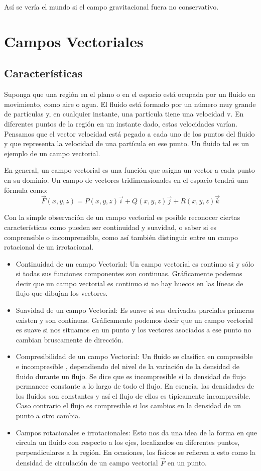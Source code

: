 \documentclass[10pt]{article}
\begin{document}
	Así se vería el mundo si el campo gravitacional fuera no conservativo.


\section{Campos Vectoriales}
\subsection{Características}%
	\parindent=0.2in
	\hangindent=0.2in
	Suponga que una región en el plano o en el espacio está ocupada por un fluido en movimiento, como aire o agua. El fluido está formado por un número muy grande de partículas y, en cualquier instante, una partícula tiene una velocidad v. En diferentes puntos de la región en un instante dado, estas velocidades varían. Pensamos que el vector velocidad está pegado a cada uno de los puntos del fluido y que representa la velocidad de una partícula en ese punto. Un fluido tal es un ejemplo de un campo vectorial. 
	\pagebreak

	\parindent=0.2in
	\hangindent=0.2in
	En general, un campo vectorial es una función que asigna un vector a cada punto en su dominio. Un campo de vectores tridimensionales en el espacio tendrá una fórmula como:
	\[ \vec{F}(x,y,z) = P(x,y,z)\vec{i} + Q(x,y,z)\vec{j} + R(x,y,z)\vec{k}  \]

	\parindent=0.2in
	\hangindent=0.2in
	Con la simple observación de un campo vectorial es posible reconocer ciertas características como pueden ser continuidad y suavidad, o saber si es comprensible o incomprensible, como así también distinguir entre un campo rotacional de un irrotacional. 
	\begin{itemize}
		\item Continuidad de un campo Vectorial: Un campo vectorial es continuo si y sólo si todas sus funciones componentes son continuas. Gráficamente podemos decir que un campo vectorial es continuo si no hay huecos en las líneas de flujo que dibujan los vectores.
		\item Suavidad de un campo Vectorial: Es suave si sus derivadas parciales primeras existen y son continuas. Gráficamente podemos decir que un campo vectorial es suave si nos situamos en un punto y los vectores asociados a ese punto no cambian bruscamente de dirección.
		\item Compresibilidad de un campo Vectorial: Un fluido se clasifica en compresible e incompresible , dependiendo del nivel de la variación de la densidad de fluido durante un flujo. Se dice que es incompresible si la densidad de flujo permanece constante a lo largo de todo el flujo. En esencia, las densidades de los fluidos son constantes y así el flujo de ellos es típicamente incompresible. Caso contrario el flujo es compresible si los cambios en la densidad de un punto a otro cambia.
		\item Campos rotacionales e irrotacionales:  Esto nos da una idea de la forma en que circula un fluido con respecto a los ejes, localizados en diferentes puntos, perpendiculares a la región. En ocasiones, los físicos se refieren a esto como la densidad de circulación de un campo vectorial $\vec{F}$ en un punto.
	\end{itemize}
\end{document}
